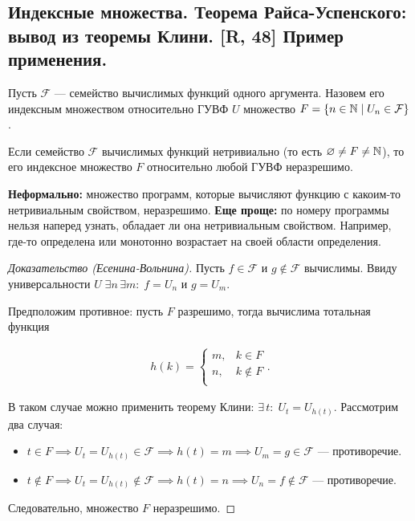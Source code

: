 \documentclass[a4paper, fleqn]{article}
\newcommand{\void}{\varnothing} %
\begin{document}
    \subsection{Индексные множества. Теорема Райса-Успенского: вывод из теоремы Клини. [R, 48] Пример применения.}

        Пусть $\mathcal{F}$ --- семейство вычислимых функций одного аргумента. Назовем его индексным множеством относительно ГУВФ $U$ множество $F = \{ n \in \mathbb{N} \mid U_n \in \mathcal{F} \}$.

        \begin{theorem}
            Если семейство $\mathcal{F}$ вычислимых функций нетривиально (то есть $\void \ne F \ne \NN$), то его индексное множество $F$ относительно любой ГУВФ неразрешимо.
        \end{theorem}

        \textbf{Неформально:} множество программ, которые вычисляют функцию с какоим-то нетривиальным свойством, неразрешимо. \textbf{Еще проще:} по номеру программы нельзя наперед узнать, обладает ли она нетривиальным свойством. Например, где-то определена или монотонно возрастает на своей области определения.

        \begin{proof}[Доказательство (Есенина-Вольнина)]
        Пусть $f \in \mathcal{F}$ и $g \notin \mathcal{F}$ вычислимы. Ввиду универсальности $U \; \exists n \, \exists m : \; f = U_n$ и $g = U_m$.

        Предположим противное: пусть $F$ разрешимо, тогда вычислима тотальная функция

        \begin{equation*}
        \begin{gathered}
        h(k) =
        \begin{cases}
        m, & k \in F \\
        n, & k \notin F \\
        \end{cases}.
        \end{gathered}
        \end{equation*}

        В таком случае можно применить теорему Клини: $\exists \, t : \; U_t = U_{h(t)}$. Рассмотрим два случая:

        \begin{itemize}
            \item $t \in F \implies U_t = U_{h(t)} \in \mathcal{F} \implies h(t) = m \implies U_m = g \in \mathcal{F}$ --- противоречие.

            \item $t \notin F \implies U_t = U_{h(t)} \notin \mathcal{F} \implies h(t) = n \implies U_n = f \notin \mathcal{F}$ --- противоречие.
        \end{itemize}

        Следовательно, множество $F$ неразрешимо.
        \end{proof}
\end{document}
